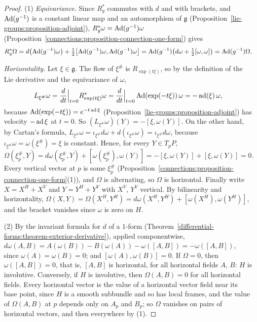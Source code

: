 \begin{proof}
(1) \emph{Equivariance.} Since $R_g^*$ commutes with $d$ and with brackets, and $\operatorname{Ad}(g^{-1})$ is a constant linear map and an automorphism of $\mathfrak{g}$
(Proposition~\ref{lie-groups:proposition-adjoint}), $R_g^*\omega = \operatorname{Ad}(g^{-1})\omega$ (Proposition~\ref{connections:proposition-connection-one-form}) gives
\[
R_g^*\Omega = d\bigl(\operatorname{Ad}(g^{-1})\omega\bigr) + \tfrac12\bigl[\operatorname{Ad}(g^{-1})\omega, \operatorname{Ad}(g^{-1})\omega\bigr] = \operatorname{Ad}(g^{-1})\bigl(d\omega + \tfrac12[\omega, \omega]\bigr) = \operatorname{Ad}(g^{-1})\Omega .
\]

\emph{Horizontality.} Let $\xi \in \mathfrak{g}$. The flow of $\xi^\#$ is $R_{\exp(t\xi)}$, so by the definition of the Lie derivative and the equivariance of $\omega$,
\[
L_{\xi^\#}\omega = \frac{d}{dt}\Big|_{t=0}R_{\exp(t\xi)}^*\omega = \frac{d}{dt}\Big|_{t=0}\operatorname{Ad}(\exp(-t\xi))\,\omega = -\operatorname{ad}(\xi)\,\omega,
\]
because $\operatorname{Ad}(\exp(-t\xi)) = e^{-t\operatorname{ad}\xi}$ (Proposition~\ref{lie-groups:proposition-adjoint}) has velocity $-\operatorname{ad}\xi$ at $t = 0$. So $(L_{\xi^\#}\omega)(Y) = -[\xi, \omega(Y)]$. On the other hand, by Cartan's formula,
$L_{\xi^\#}\omega = \iota_{\xi^\#}d\omega + d(\iota_{\xi^\#}\omega) = \iota_{\xi^\#}d\omega$, because $\iota_{\xi^\#}\omega = \omega(\xi^\#) = \xi$ is constant. Hence, for every $Y \in T_pP$,
\[
\Omega(\xi^\#_p, Y) = d\omega(\xi^\#_p, Y) + [\omega(\xi^\#_p), \omega(Y)] = -[\xi, \omega(Y)] + [\xi, \omega(Y)] = 0 .
\]
Every vertical vector at $p$ is some $\xi^\#_p$ (Proposition~\ref{connections:proposition-connection-one-form}(1)), and $\Omega$ is alternating, so $\Omega$ is horizontal. Finally write
$X = X^H + X^V$ and $Y = Y^H + Y^V$ with $X^V$, $Y^V$ vertical. By bilinearity and horizontality, $\Omega(X, Y) = \Omega(X^H, Y^H) = d\omega(X^H, Y^H) + [\omega(X^H), \omega(Y^H)]$, and the bracket
vanishes since $\omega$ is zero on $H$.

(2) By the invariant formula for $d$ of a $1$-form (Theorem~\ref{differential-forms:theorem-exterior-derivative}), applied componentwise,
$d\omega(A, B) = A(\omega(B)) - B(\omega(A)) - \omega([A, B]) = -\omega([A, B])$, since $\omega(A) = \omega(B) = 0$; and $[\omega(A), \omega(B)] = 0$. If $\Omega = 0$, then $\omega([A, B]) = 0$, that is, $[A, B]$ is horizontal,
for all horizontal fields $A$, $B$: $H$ is involutive. Conversely, if $H$ is involutive, then $\Omega(A, B) = 0$ for all horizontal fields. Every horizontal vector is the value of a horizontal vector field near its base
point, since $H$ is a smooth subbundle and so has local frames, and the value of $\Omega(A, B)$ at $p$ depends only on $A_p$ and $B_p$; so $\Omega$ vanishes on pairs of horizontal vectors, and then everywhere by (1).


\end{proof}

